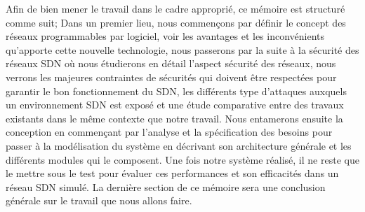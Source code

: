 Afin de bien mener le travail dans le cadre approprié, ce mémoire est structuré comme suit; Dans un premier lieu, nous commençons par définir le concept des réseaux programmables par logiciel, voir les avantages et les inconvénients qu'apporte cette nouvelle technologie, nous passerons par la suite à la sécurité des réseaux SDN où nous étudierons en détail l'aspect sécurité des réseaux, nous verrons les majeures contraintes de sécurités qui doivent être respectées pour garantir le bon fonctionnement du SDN, les différents type d’attaques auxquels un environnement SDN est exposé et une étude comparative entre des travaux existants dans le même contexte que notre travail. Nous entamerons ensuite la conception en commençant par l'analyse et la spécification des besoins pour passer à la modélisation du système en décrivant son architecture générale et les différents modules qui le composent. Une fois notre système réalisé, il ne reste que le mettre sous le test pour évaluer ces performances et son efficacités dans un réseau SDN simulé. La dernière section de ce mémoire sera une conclusion générale sur le travail que nous allons faire.\\

